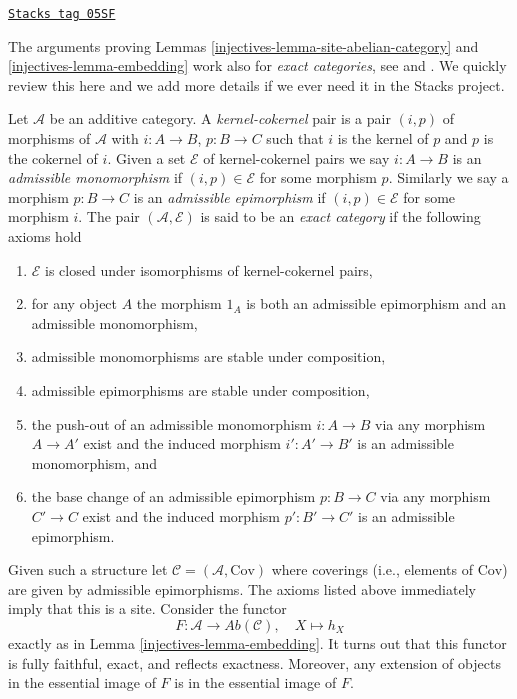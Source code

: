 \begin{remark}
\label{injectives-remark-embed-exact-category}
\href{https://stacks.math.columbia.edu/tag/05SF}{\texttt{Stacks tag 05SF}}

The arguments proving
Lemmas \ref{injectives-lemma-site-abelian-category} and
\ref{injectives-lemma-embedding}
work also for {\it exact categories}, see
\cite[Appendix A]{Buhler} and
\cite[1.1.4]{BBD}.
We quickly review this here and we add more details if we ever
need it in the Stacks project.

\medskip\noindent
Let $\mathcal{A}$ be an additive category.
A {\it kernel-cokernel} pair is a pair $(i, p)$
of morphisms of $\mathcal{A}$ with
$i : A \to B$, $p : B \to C$ such that $i$ is the kernel of
$p$ and $p$ is the cokernel of $i$.
Given a set $\mathcal{E}$ of kernel-cokernel pairs we say
$i : A \to B$ is an {\it admissible monomorphism}
if $(i, p) \in \mathcal{E}$ for some morphism $p$.
Similarly we say a morphism $p : B \to C$ is an {\it admissible epimorphism}
if $(i, p) \in \mathcal{E}$ for some morphism $i$.
The pair $(\mathcal{A}, \mathcal{E})$ is said to be an
{\it exact category} if the following axioms hold
\begin{enumerate}
\item $\mathcal{E}$ is closed under isomorphisms of kernel-cokernel
pairs,
\item for any object $A$ the morphism $1_A$ is both an admissible epimorphism
and an admissible monomorphism,
\item admissible monomorphisms are stable under composition,
\item admissible epimorphisms are stable under composition,
\item the push-out of an admissible monomorphism $i : A \to B$ via
any morphism $A \to A'$ exist and the induced morphism $i' : A' \to B'$
is an admissible monomorphism, and
\item the base change of an admissible epimorphism $p : B \to C$ via
any morphism $C' \to C$ exist and the induced morphism $p' : B' \to C'$
is an admissible epimorphism.
\end{enumerate}
Given such a structure let $\mathcal{C} = (\mathcal{A}, \text{Cov})$
where coverings (i.e., elements of $\text{Cov}$) are given by
admissible epimorphisms. The axioms listed above
immediately imply that this is a site. Consider the functor
$$
F : \mathcal{A} \longrightarrow \textit{Ab}(\mathcal{C}), \quad
X \longmapsto h_X
$$
exactly as in
Lemma \ref{injectives-lemma-embedding}.
It turns out that this functor is fully faithful, exact, and reflects
exactness. Moreover, any extension of objects in the essential image
of $F$ is in the essential image of $F$.
\end{remark}

